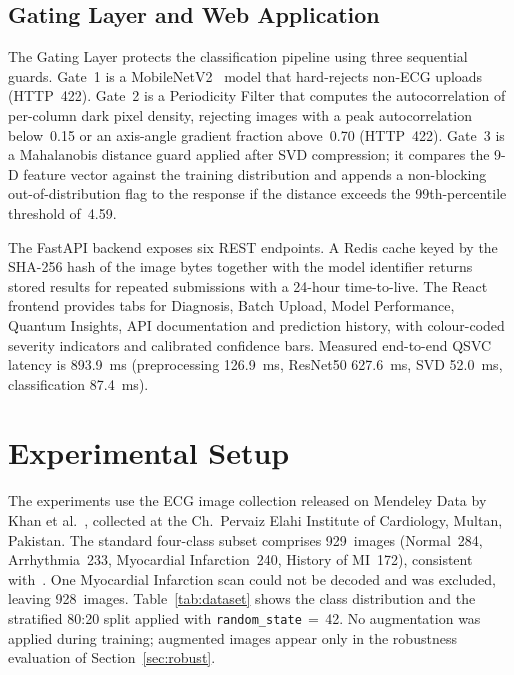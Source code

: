 \documentclass[10pt,conference]{IEEEtran}
\begin{document}
\subsection{Gating Layer and Web Application}

The Gating Layer protects the classification pipeline using three
sequential guards. Gate~1 is a MobileNetV2~\cite{sandler2018} model
that hard-rejects non-ECG uploads (HTTP~422). Gate~2 is a Periodicity
Filter that computes the autocorrelation of per-column dark pixel
density, rejecting images with a peak autocorrelation below~0.15 or an
axis-angle gradient fraction above~0.70 (HTTP~422). Gate~3 is a
Mahalanobis distance guard applied after SVD compression; it compares
the 9-D feature vector against the training distribution and appends a
non-blocking out-of-distribution flag to the response if the distance
exceeds the 99th-percentile threshold of~4.59.

The FastAPI backend exposes six REST endpoints. A Redis cache keyed by
the SHA-256 hash of the image bytes together with the model identifier
returns stored results for repeated submissions with a 24-hour
time-to-live. The React frontend provides tabs for Diagnosis, Batch
Upload, Model Performance, Quantum Insights, API documentation and
prediction history, with colour-coded severity indicators and calibrated
confidence bars. Measured end-to-end QSVC latency is 893.9~ms
(preprocessing 126.9~ms, ResNet50 627.6~ms, SVD 52.0~ms,
classification 87.4~ms).

\section{Experimental Setup}

The experiments use the ECG image collection released on Mendeley Data
by Khan et al.~\cite{khan2021}, collected at the Ch.\ Pervaiz Elahi
Institute of Cardiology, Multan, Pakistan. The standard four-class
subset comprises 929~images (Normal~284, Arrhythmia~233, Myocardial
Infarction~240, History of MI~172), consistent with~\cite{prabhu2023}.
One Myocardial Infarction scan could not be decoded and was excluded,
leaving 928~images. Table~\ref{tab:dataset} shows the class
distribution and the stratified 80:20 split applied with
\texttt{random\_state}\,$=$\,42. No augmentation was applied during
training; augmented images appear only in the robustness evaluation of
Section~\ref{sec:robust}.
\end{document}
